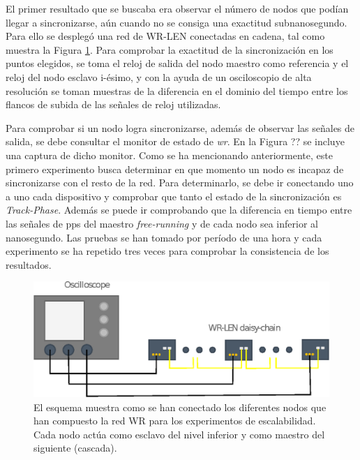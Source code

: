 El primer resultado que se buscaba era observar el número de nodos que podían 
llegar a sincronizarse, aún cuando no se consiga una exactitud subnanosegundo. 
Para ello se desplegó una red de WR-LEN conectadas en cadena, tal como muestra 
la Figura \ref{fig:chainschema}. Para comprobar la exactitud de la 
sincronización en los puntos elegidos, se toma el reloj de salida del nodo 
maestro como referencia y el reloj del nodo esclavo i-ésimo, y con la ayuda de 
un osciloscopio de alta resolución se toman muestras de la diferencia en el 
dominio del tiempo entre los flancos de subida de las señales de reloj 
utilizadas.


Para comprobar si un nodo logra sincronizarse, además de observar las señales 
de salida, se debe consultar el monitor de estado de \textit{wr}. En la Figura 
?? se incluye una captura de dicho monitor.  Como se ha mencionando anteriormente, este primero experimento busca 
determinar en que momento un nodo es incapaz de sincronizarse con el resto de 
la red. Para determinarlo, se debe ir conectando uno a uno cada dispositivo y 
comprobar que tanto el estado de la sincronización es \textit{Track-Phase}. 
Además se puede ir comprobando que la diferencia en tiempo entre las señales de 
\gls{pps} del maestro \textit{free-running} y de cada nodo sea inferior al 
nanosegundo. Las pruebas se han tomado por período de una hora y cada 
experimento se ha repetido tres veces para comprobar la consistencia de los 
resultados.

\begin{figure}
	\centering
	\includegraphics[width=0.7\linewidth]{imagenes/chain_schema}
	\caption[Esquema de conexión para los experimentos de escalabilidad.]{El 
	esquema muestra como se han conectado los diferentes nodos que han 
	compuesto la red WR para los experimentos de escalabilidad. Cada nodo actúa 
	como esclavo del nivel inferior y como maestro del siguiente (cascada).}
	\label{fig:chainschema}
\end{figure}

